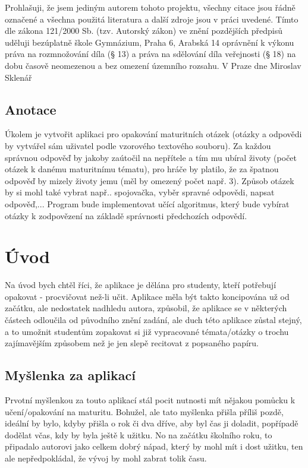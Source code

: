 \documentclass[12pt]{report}
\def\Author{Miroslav Sklenář}
\begin{document}
\graphicspath{{./img/}}
\setcounter{tocdepth}{3}
\renewcommand*\contentsname{Obsah}
\renewcommand{\bibfont}{\small}
\renewcommand\listoflistingscaption{Seznam příloh}
\renewcommand{\listingscaption}{Příloha}

\newpage{}
\thispagestyle{empty}
\mbox{}
\vfill
Prohlašuji, že jsem jediným autorem tohoto projektu, všechny citace jsou řádně označené a všechna použitá literatura a další zdroje jsou v práci uvedené. Tímto dle zákona 121/2000 Sb. (tzv. Autorský zákon) ve znění pozdějších předpisů uděluji bezúplatně škole Gymnázium, Praha 6, Arabská 14
oprávnění k výkonu práva na rozmnožování díla (§ 13) a práva na sdělování díla veřejnosti (§ 18) na dobu časově neomezenou a bez omezení územního rozsahu.
\newline
V Praze dne \hfill \Author
\newpage{}
\thispagestyle{empty}
\section*{Anotace}
Úkolem je vytvořit aplikaci pro opakování maturitních otázek (otázky a odpovědi by vytvářel sám uživatel podle vzorového textového souboru). Za každou správnou odpověď by jakoby zaútočil na
nepřítele a tím mu ubíral životy (počet otázek k danému maturitnímu tématu), pro hráče by platilo, že za špatnou odpověď by mizely životy jemu (měl by omezený počet např. 3).
Způsob otázek by si mohl také vybrat např.. spojovačka, vyběr spravné odpovědi, napsat odpověď,...
Program bude implementovat učící algoritmus, který bude vybírat otázky k zodpovězení na základě správnosti předchozích odpovědí.

\newpage
\setcounter{page}{1}
\tableofcontents 
\newpage
\chapter{Úvod}
Na úvod bych chtěl říci, že aplikace je dělána pro studenty, kteří potřebují opakovat - procvičovat než-li učit. Aplikace měla být takto koncipována už od začátku, ale nedostatek nadhledu autora, způsobil, že aplikace se v některých částech odloučila od původního znění zadání, ale duch této aplikace zůstal stejný, a to umožnit studentům zopakovat si již vypracované témata/otázky o trochu zajímavějším způsobem než je jen slepě recitovat z popsaného papíru.
\section{Myšlenka za aplikací}
Prvotní myšlenkou za touto aplikací stál pocit nutnosti mít nějakou pomůcku k učení/opakování na maturitu. Bohužel, ale tato myšlenka přišla příliš pozdě, ideální by bylo, kdyby přišla o rok či dva dříve, aby byl čas ji doladit, popřípadě dodělat včas, kdy by byla ještě k užitku. No na začátku školního roku, to připadalo autorovi jako celkem dobrý nápad, který by mohl mít i dost užitku, ten ale nepředpokládal, že vývoj by mohl zabrat tolik času.
\newpage
\end{document}
